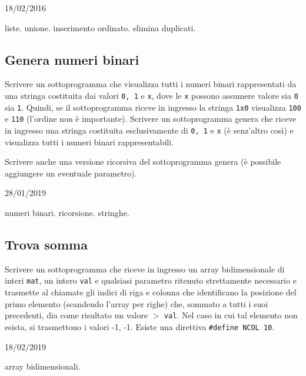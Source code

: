 \begin{esame}
18/02/2016
\end{esame}

\begin{tags}
liste. unione. inserimento ordinato. elimina duplicati.
\end{tags}


\subsection{Genera numeri binari}
Scrivere un sottoprogramma che visualizza tutti i numeri binari rappresentati da una stringa costituita dai valori \texttt{0, 1} e \texttt{x}, dove le \texttt{x} possono assumere valore sia \texttt{0} sia \texttt{1}. 
Quindi, se il sottoprogramma riceve in ingresso la stringa \texttt{1x0} visualizza \texttt{100} e \texttt{110} (l’ordine non \`e importante).
Scrivere un sottoprogramma genera che riceve in ingresso una stringa costituita esclusivamente di \texttt{0, 1} e \texttt{x} (\`e senz'altro cos\`i) e visualizza tutti i numeri binari rappresentabili.

Scrivere anche una versione ricorsiva del sottoprogramma genera (\`e possibile aggiungere un eventuale parametro).

\begin{esame}
28/01/2019
\end{esame}

\begin{tags}
numeri binari. ricorsione. stringhe.
\end{tags}



\subsection{Trova somma}
Scrivere un sottoprogramma che riceve in ingresso un array bidimensionale di interi \texttt{mat}, un intero \texttt{val} e qualsiasi parametro ritenuto strettamente necessario e trasmette al chiamate gli indici di riga e colonna che identificano la posizione del primo elemento (scandendo l'array per righe) che, sommato a tutti i suoi precedenti, dia come risultato un valore $>$ \texttt{val}.
Nel caso in cui tal elemento non esista, si trasmettono i valori -1, -1. 
Esiste una direttiva \texttt{\#define NCOL 10}.

\begin{esame}
18/02/2019
\end{esame}

\begin{tags}
array bidimensionali.
\end{tags}


